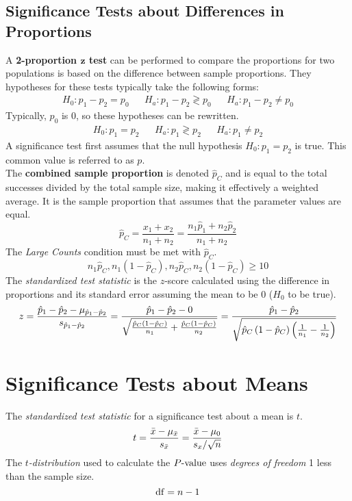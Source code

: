 \documentclass[../AP_Statistics.tex]{subfiles}
\begin{document}
			\subsection*{Significance Tests about Differences in Proportions}
				A \textbf{2-proportion $\bm{z}$ test} can be performed to compare the proportions for two populations is based on the difference between sample proportions. They hypotheses for these tests typically take the following forms:
				\begin{align*}
					H_0:p_1 - p_2 = p_0 && H_a: p_1 - p_2 \gtrless p_0 && H_a:p_1 - p_2 \ne p_0
				\end{align*}
				Typically, $p_0$ is 0, so these hypotheses can be rewritten.
				\begin{align*}
					H_0:p_1 = p_2 && H_a:p_1 \gtrless p_2 && H_a:p_1 \ne p_2
				\end{align*}
				A significance test first assumes that the null hypothesis $H_0:p_1 = p_2$ is true. This common value is referred to as $p$. \\
				The \textbf{combined sample proportion} is denoted $\hat{p}_C$ and is equal to the total successes divided by the total sample size, making it effectively a weighted average. It is the sample proportion that assumes that the parameter values are equal.
				\[\hat{p}_C = \frac{x_1 + x_2}{n_1 + n_2} = \frac{n_1\hat{p}_1 + n_2\hat{p}_2}{n_1 + n_2}\]
				The \emph{Large Counts} condition must be met with $\hat{p}_C$.
				\[n_1\hat{p}_C, n_1(1 - \hat{p}_C), n_2\hat{p}_C, n_2(1 - \hat{p}_C) \ge 10\]
				The \emph{standardized test statistic} is the $z$-score calculated using the difference in proportions and its standard error assuming the mean to be 0 ($H_0$ to be true).
				\[z = \frac{\hat{p}_1 - \hat{p}_2 - \mu_{\hat{p}_1 - \hat{p}_2}}{s_{\hat{p}_1 - \hat{p}_2}} = \frac{\hat{p}_1 - \hat{p}_2 - 0}{\sqrt{\frac{\hat{p}_C\left(1 - \hat{p}_C\right)}{n_1} + \frac{\hat{p}_C\left(1 - \hat{p}_C\right)}{n_2}}} = \frac{\hat{p}_1 - \hat{p}_2}{\sqrt{\hat{p}_C\left(1 - \hat{p}_C\right)\left(\frac{1}{n_1} - \frac{1}{n_2}\right)}}\]
		\section{Significance Tests about Means}
			The \emph{standardized test statistic} for a significance test about a mean is $t$.
			\[t = \frac{\bar{x} - \mu_{\bar{x}}}{s_{\bar{x}}} = \frac{\bar{x} - \mu_0}{s_x/\sqrt{n}}\]
			The \emph{$t$-distribution} used to calculate the $P\text{-value}$ uses \emph{degrees of freedom} 1 less than the sample size.
			\[\operatorname{\mathrm{df}} = n - 1\]
\end{document}
